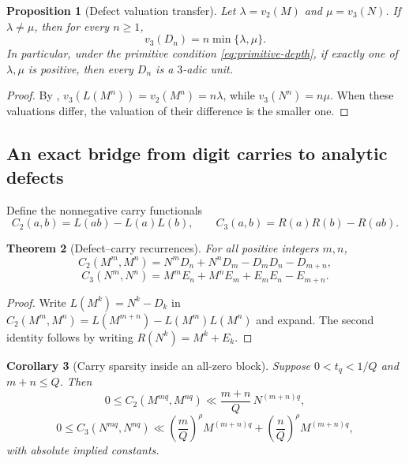 \documentclass[11pt]{article}
\newtheorem{theorem}{Theorem}[section]
\newtheorem{proposition}[theorem]{Proposition}
\newtheorem{corollary}[theorem]{Corollary}
\theoremstyle{definition}
\theoremstyle{remark}
\begin{document}
\begin{proposition}[Defect valuation transfer]\label{prop:defect-valuation}
Let $\lambda=v_2(M)$ and $\mu=v_3(N)$.  If $\lambda\ne\mu$, then for every $n\ge1$,
\begin{equation}\label{eq:D-valuation}
 v_3(D_n)=n\min\{\lambda,\mu\}.
\end{equation}
In particular, under the primitive condition \eqref{eq:primitive-depth}, if exactly
one of $\lambda,\mu$ is positive, then every $D_n$ is a $3$-adic unit.
\end{proposition}

\begin{proof}
By ,
$v_3(L(M^n))=v_2(M^n)=n\lambda$, while
$v_3(N^n)=n\mu$.  When these valuations differ, the valuation of their difference is
the smaller one.
\end{proof}

\subsection{An exact bridge from digit carries to analytic defects}

Define the nonnegative carry functionals
\begin{equation}\label{eq:carry-functionals}
 C_2(a,b)=L(ab)-L(a)L(b),
 \qquad
 C_3(a,b)=R(a)R(b)-R(ab).
\end{equation}

\begin{theorem}[Defect--carry recurrences]\label{thm:defect-carry-recurrence}
For all positive integers $m,n$,
\begin{equation}\label{eq:D-carry-recurrence}
 C_2(M^m,M^n)
 =N^mD_n+N^nD_m-D_mD_n-D_{m+n},
\end{equation}
\begin{equation}\label{eq:E-carry-recurrence}
 C_3(N^m,N^n)
 =M^mE_n+M^nE_m+E_mE_n-E_{m+n}.
\end{equation}
\end{theorem}

\begin{proof}
Write $L(M^k)=N^k-D_k$ in
$C_2(M^m,M^n)=L(M^{m+n})-L(M^m)L(M^n)$ and expand.  The second identity follows by
writing $R(N^k)=M^k+E_k$.
\end{proof}

\begin{corollary}[Carry sparsity inside an all-zero block]
\label{cor:carry-sparsity}
Suppose $0<t_q<1/Q$ and $m+n\le Q$.  Then
\begin{equation}\label{eq:C2-small}
 0\le C_2(M^{mq},M^{nq})
 \ll \frac{m+n}{Q}\,N^{(m+n)q},
\end{equation}
\begin{equation}\label{eq:C3-small}
 0\le C_3(N^{mq},N^{nq})
 \ll \left(\frac{m}{Q}\right)^\rho M^{(m+n)q}
     +\left(\frac{n}{Q}\right)^\rho M^{(m+n)q},
\end{equation}
with absolute implied constants.
\end{corollary}
\end{document}
